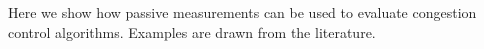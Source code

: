 Here we show how passive measurements can be used to evaluate congestion control algorithms. Examples are drawn from the literature.